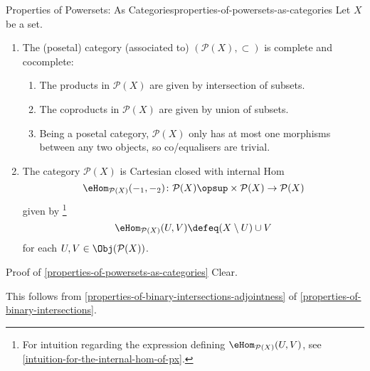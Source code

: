 \begin{proposition}{Properties of Powersets: As Categories}{properties-of-powersets-as-categories}%
    Let $X$ be a set.
    \begin{enumerate}
        \item\label{properties-of-powersets-as-categories-co-completeness}The (posetal) category (associated to) $(\mathcal{P}(X),\subset)$ is complete and cocomplete:
            \begin{enumerate}
                \item{}The products in $\mathcal{P}(X)$ are given by intersection of subsets.
                \item{}The coproducts in $\mathcal{P}(X)$ are given by union of subsets.
                \item{}Being a posetal category, $\mathcal{P}(X)$ only has at most one morphisms between any two objects, so co/equalisers are trivial.
            \end{enumerate}
        \item\label{properties-of-powersets-as-categories-cartesian-closedness}The category $\mathcal{P}(X)$ is Cartesian closed with internal Hom
            \[
                \eHom_{\mathcal{P}(X)}(-_{1},-_{2})%
                \colon
                \mathcal{P}(X)\opsup\times\mathcal{P}(X)
                \to
                \mathcal{P}(X)
            \]%
            given by%
            \footnote{%
                For intuition regarding the expression defining $\eHom_{\mathcal{P}(X)}(U,V)$, see \cref{intuition-for-the-internal-hom-of-px}.
                \par\vspace*{-1.75\baselineskip}
            }%
            \[
                \eHom_{\mathcal{P}(X)}(U,V)%
                \defeq
                (X\setminus U)\cup V
            \]%
            for each $U,V\in\Obj(\mathcal{P}(X))$.
    \end{enumerate}
\end{proposition}
\begin{Proof}{Proof of \cref{properties-of-powersets-as-categories}}%
    Clear.

    This follows from \cref{properties-of-binary-intersections-adjointness} of \cref{properties-of-binary-intersections}.
\end{Proof}
